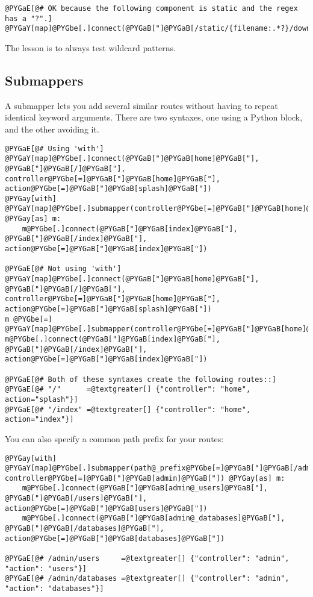 \documentclass[letterpaper,10pt,english]{manual}
\begin{document}
\begin{Verbatim}[commandchars=@\[\]]
@PYGaE[@# OK because the following component is static and the regex has a "?".]
@PYGaY[map]@PYGbe[.]connect(@PYGaB["]@PYGaB[/static/{filename:.*?}/download]@PYGaB["])
\end{Verbatim}

The lesson is to always test wildcard patterns.


\subsection{Submappers}

A submapper lets you add several similar routes
without having to repeat identical keyword arguments.  There are two syntaxes,
one using a Python  block, and the other avoiding it.

\begin{Verbatim}[commandchars=@\[\]]
@PYGaE[@# Using 'with']
@PYGaY[map]@PYGbe[.]connect(@PYGaB["]@PYGaB[home]@PYGaB["], @PYGaB["]@PYGaB[/]@PYGaB["], controller@PYGbe[=]@PYGaB["]@PYGaB[home]@PYGaB["], action@PYGbe[=]@PYGaB["]@PYGaB[splash]@PYGaB["])
@PYGay[with] @PYGaY[map]@PYGbe[.]submapper(controller@PYGbe[=]@PYGaB["]@PYGaB[home]@PYGaB["]) @PYGay[as] m:
    m@PYGbe[.]connect(@PYGaB["]@PYGaB[index]@PYGaB["], @PYGaB["]@PYGaB[/index]@PYGaB["], action@PYGbe[=]@PYGaB["]@PYGaB[index]@PYGaB["])

@PYGaE[@# Not using 'with']
@PYGaY[map]@PYGbe[.]connect(@PYGaB["]@PYGaB[home]@PYGaB["], @PYGaB["]@PYGaB[/]@PYGaB["], controller@PYGbe[=]@PYGaB["]@PYGaB[home]@PYGaB["], action@PYGbe[=]@PYGaB["]@PYGaB[splash]@PYGaB["])
m @PYGbe[=] @PYGaY[map]@PYGbe[.]submapper(controller@PYGbe[=]@PYGaB["]@PYGaB[home]@PYGaB["])
m@PYGbe[.]connect(@PYGaB["]@PYGaB[index]@PYGaB["], @PYGaB["]@PYGaB[/index]@PYGaB["], action@PYGbe[=]@PYGaB["]@PYGaB[index]@PYGaB["])

@PYGaE[@# Both of these syntaxes create the following routes::]
@PYGaE[@# "/"      =@textgreater[] {"controller": "home", action="splash"}]
@PYGaE[@# "/index" =@textgreater[] {"controller": "home", action="index"}]
\end{Verbatim}

You can also specify a common path prefix for your routes:

\begin{Verbatim}[commandchars=@\[\]]
@PYGay[with] @PYGaY[map]@PYGbe[.]submapper(path@_prefix@PYGbe[=]@PYGaB["]@PYGaB[/admin]@PYGaB["], controller@PYGbe[=]@PYGaB["]@PYGaB[admin]@PYGaB["]) @PYGay[as] m:
    m@PYGbe[.]connect(@PYGaB["]@PYGaB[admin@_users]@PYGaB["], @PYGaB["]@PYGaB[/users]@PYGaB["], action@PYGbe[=]@PYGaB["]@PYGaB[users]@PYGaB["])
    m@PYGbe[.]connect(@PYGaB["]@PYGaB[admin@_databases]@PYGaB["], @PYGaB["]@PYGaB[/databases]@PYGaB["], action@PYGbe[=]@PYGaB["]@PYGaB[databases]@PYGaB["])

@PYGaE[@# /admin/users     =@textgreater[] {"controller": "admin", "action": "users"}]
@PYGaE[@# /admin/databases =@textgreater[] {"controller": "admin", "action": "databases"}]
\end{Verbatim}
\end{document}
